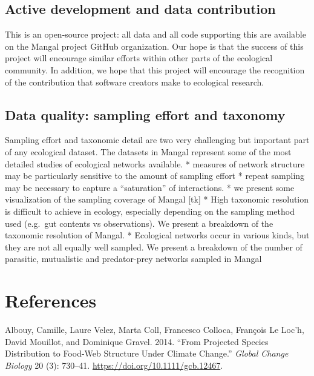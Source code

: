 \hypertarget{active-development-and-data-contribution}{%
\subsection{Active development and data
contribution}\label{active-development-and-data-contribution}}

This is an open-source project: all data and all code supporting this
are available on the Mangal project GitHub organization. Our hope is
that the success of this project will encourage similar efforts within
other parts of the ecological community. In addition, we hope that this
project will encourage the recognition of the contribution that software
creators make to ecological research.

\hypertarget{data-quality-sampling-effort-and-taxonomy}{%
\subsection{Data quality: sampling effort and
taxonomy}\label{data-quality-sampling-effort-and-taxonomy}}

Sampling effort and taxonomic detail are two very challenging but
important part of any ecological dataset. The datasets in Mangal
represent some of the most detailed studies of ecological networks
available. * measures of network structure may be particularly sensitive
to the amount of sampling effort * repeat sampling may be necessary to
capture a ``saturation'' of interactions. * we present some
visualization of the sampling coverage of Mangal {[}tk{]} * High
taxonomic resolution is difficult to achieve in ecology, especially
depending on the sampling method used (e.g.~gut contents vs
observations). We present a breakdown of the taxonomic resolution of
Mangal. * Ecological networks occur in various kinds, but they are not
all equally well sampled. We present a breakdown of the number of
parasitic, mutualistic and predator-prey networks sampled in Mangal

\hypertarget{references}{%
\section*{References}\label{references}}

\hypertarget{refs}{}
\leavevmode\hypertarget{ref-AlboVele14}{}%
Albouy, Camille, Laure Velez, Marta Coll, Francesco Colloca, François Le
Loc'h, David Mouillot, and Dominique Gravel. 2014. ``From Projected
Species Distribution to Food-Web Structure Under Climate Change.''
\emph{Global Change Biology} 20 (3): 730--41.
\url{https://doi.org/10.1111/gcb.12467}.

